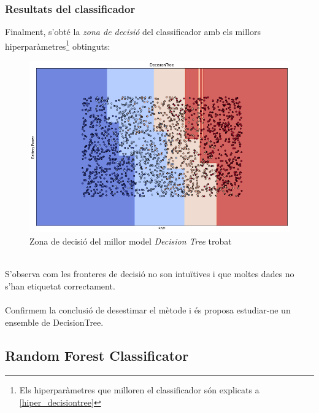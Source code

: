\documentclass[a4paper, 11pt]{article}
\begin{document}
\subsubsection{Resultats del classificador}\label{zona_decisiontree}
Finalment, s'obté la \textit{zona de decisió} del classificador amb els millors hiperparàmetres\footnote{Els hiperparàmetres que milloren el classificador són explicats a \textcolor{blue}{\ref{hiper_decisiontree}}} obtinguts:\\
\begin{figure}[h]
    \centering
    \includegraphics[width = 1\textwidth]{ZonasModelos/zona_decision.png}
    \caption{Zona de decisió del millor model \textit{Decision Tree} trobat}
    \label{fig:my_label}
\end{figure}\\
S'observa com les fronteres de decisió no son intuïtives i que moltes dades no s'han etiquetat correctament.\\\\
Confirmem la conclusió de desestimar el mètode i és proposa estudiar-ne un ensemble de DecisionTree.
\newpage


\subsection{Random Forest Classificator}\label{random}
\end{document}
